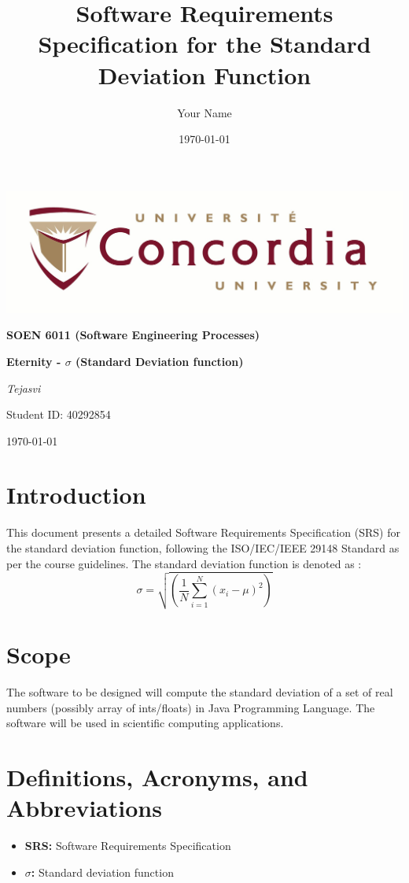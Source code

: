 \documentclass{article}
\title{Software Requirements Specification for the Standard Deviation Function}
\author{Your Name}
\date{\today}
\begin{document}
\begin{titlepage}
    \centering
    \includegraphics[width=1\textwidth]{University_logo.jpg}\par\vspace{1cm} 
    {\huge\bfseries SOEN 6011 (Software Engineering Processes) \par}
    \vspace{2cm}
    {\huge\bfseries Eternity - $\sigma$ (Standard Deviation function) \par}
    \vspace{2cm}
    {\huge\itshape Tejasvi\par}
    \vspace{0.5cm}
    Student ID: 40292854\par
    \vfill
    {\large \today\par}
\end{titlepage}

\tableofcontents
\newpage

\section{Introduction}
This document presents a detailed Software Requirements Specification (SRS) for the standard deviation function, following the ISO/IEC/IEEE 29148 Standard as per the course guidelines. The standard deviation function is denoted as :
\[
\sigma = \sqrt{(\frac{1}{N}\sum_{i=1}^{N}(x_i - \mu)^2)}
\]

\section{Scope}
The software to be designed will compute the standard deviation of a set of real numbers (possibly array of ints/floats) in Java Programming Language. The software will be used in scientific computing applications.

\section{Definitions, Acronyms, and Abbreviations}
\begin{itemize}
\item \textbf{SRS:} Software Requirements Specification
\item \textbf{$\sigma$:} Standard deviation function
\end{itemize}
\end{document}
